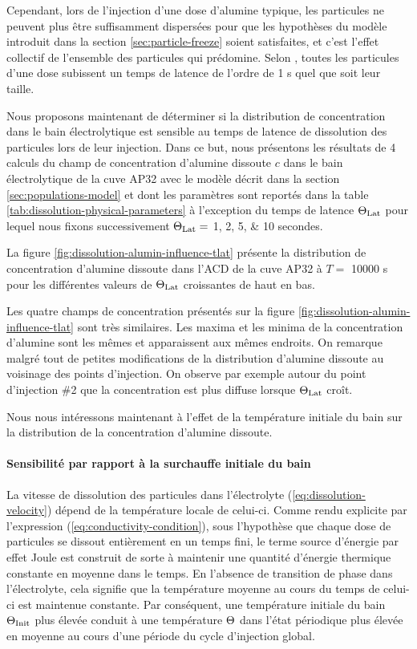 Cependant, lors de l'injection d'une dose d'alumine typique, les
particules ne peuvent plus être suffisamment dispersées pour que
les hypothèses du modèle introduit dans la section
\ref{sec:particle-freeze} soient satisfaites, et c'est l'effet
collectif de l'ensemble des particules qui prédomine. Selon
\cite{Dassylva2015}, toutes les particules d'une dose subissent un
temps de latence de l'ordre de \num{1} \si{\second} quel que soit leur
taille.

Nous proposons maintenant de déterminer si la distribution de
concentration dans le bain électrolytique est sensible au temps de
latence de dissolution des particules lors de leur injection. Dans ce
but, nous présentons les résultats de 4 calculs du champ de
concentration d'alumine dissoute $c$ dans le bain électrolytique de la
cuve AP32 avec le modèle décrit dans la section
\ref{sec:populations-model} et dont les paramètres sont reportés dans
la table \ref{tab:dissolution-physical-parameters} à l'exception du
temps de latence $\Theta_\text{Lat}$ pour lequel nous fixons successivement $\Theta_\text{Lat}
= $ \numlist{1;2;5;10} secondes.



La figure \ref{fig:dissolution-alumin-influence-tlat} présente la
distribution de concentration d'alumine dissoute dans l'ACD de la cuve
AP32 à $T = $ \num{10000} \si{\second} pour les différentes valeurs
de $\Theta_\text{Lat}$ croissantes de haut en bas.

Les quatre champs de concentration présentés sur la figure
\ref{fig:dissolution-alumin-influence-tlat} sont très similaires. Les
maxima et les minima de la concentration d'alumine
sont les mêmes et apparaissent aux mêmes endroits. On remarque
malgré tout de petites modifications de la distribution d'alumine
dissoute au voisinage des points d'injection. On observe par exemple
autour du point d'injection \#2 que la concentration est plus diffuse
lorsque $\Theta_\text{Lat}$ croît.

Nous nous intéressons maintenant à l'effet de la température
initiale du bain sur la distribution de la concentration d'alumine dissoute.

\paragraph{Sensibilité par rapport à la surchauffe initiale du bain}
La vitesse de dissolution des particules dans l'électrolyte
(\ref{eq:dissolution-velocity}) dépend de la température locale de
celui-ci. Comme rendu explicite par l'expression
(\ref{eq:conductivity-condition}), sous l'hypothèse que chaque dose de
particules se dissout entièrement en un temps fini, le terme source
d'énergie par effet Joule est construit de sorte à maintenir une
quantité d'énergie thermique constante en moyenne dans le temps. En
l'absence de transition de phase dans l'électrolyte, cela signifie que
la température moyenne au cours du temps de celui-ci est maintenue
constante. Par conséquent, une température initiale du bain $\Theta_\text{Init}$
plus élevée conduit à une température $\Theta$ dans l'état
périodique plus élevée en moyenne au cours d'une période
du cycle d'injection global.

